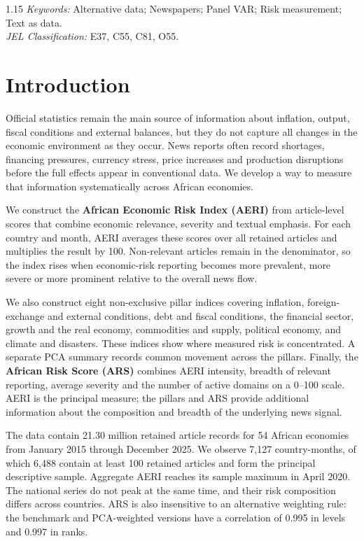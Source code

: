\documentclass[12pt]{article}
\begin{document}
\begin{spacing}{1.15}
\noindent\textit{Keywords:} Alternative data; Newspapers; Panel VAR; Risk measurement; Text as data.\\
\textit{JEL Classification:} E37, C55, C81, O55.
\end{spacing}
\newpage


\section{Introduction}\label{sec:introduction}
Official statistics remain the main source of information about inflation, output, fiscal conditions and external balances, but they do not capture all changes in the economic environment as they occur. News reports often record shortages, financing pressures, currency stress, price increases and production disruptions before the full effects appear in conventional data. We develop a way to measure that information systematically across African economies.

We construct the \textbf{African Economic Risk Index (AERI)} from article-level scores that combine economic relevance, severity and textual emphasis. For each country and month, AERI averages these scores over all retained articles and multiplies the result by 100. Non-relevant articles remain in the denominator, so the index rises when economic-risk reporting becomes more prevalent, more severe or more prominent relative to the overall news flow.

We also construct eight non-exclusive pillar indices covering inflation, foreign-exchange and external conditions, debt and fiscal conditions, the financial sector, growth and the real economy, commodities and supply, political economy, and climate and disasters. These indices show where measured risk is concentrated. A separate PCA summary records common movement across the pillars. Finally, the \textbf{African Risk Score (ARS)} combines AERI intensity, breadth of relevant reporting, average severity and the number of active domains on a 0--100 scale. AERI is the principal measure; the pillars and ARS provide additional information about the composition and breadth of the underlying news signal.

The data contain 21.30 million retained article records for 54 African economies from January 2015 through December 2025. We observe 7,127 country-months, of which 6,488 contain at least 100 retained articles and form the principal descriptive sample. Aggregate AERI reaches its sample maximum in April 2020. The national series do not peak at the same time, and their risk composition differs across countries. ARS is also insensitive to an alternative weighting rule: the benchmark and PCA-weighted versions have a correlation of 0.995 in levels and 0.997 in ranks.
\end{document}
